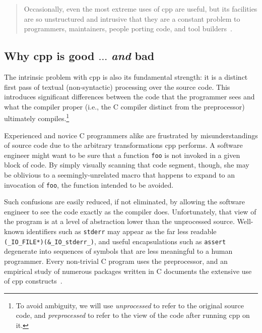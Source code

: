 \documentclass{article}
\newcommand{\Cpp}{\mbox{\textsf{cpp}}}
\newcommand{\C}{\mbox{C}}
\newcommand{\ie}{i.e.,}
\begin{document}
\begin{quotation}
\noindent Occasionally, even the most extreme uses of \Cpp{} are useful, but its
facilities are so unstructured and intrusive that they are a constant
problem to programmers, maintainers, people porting code, and tool
builders~\cite[p.~424]{Stroustrup94}.
\end{quotation}

\subsection*{Why \Cpp{} is good $\ldots$ \emph{and} bad}

The intrinsic problem with \Cpp{} is also its fundamental strength: it
is a distinct first pass of textual (non-syntactic) processing over the
source code.  This introduces significant differences between the code
that the programmer sees and what the compiler proper (\ie{} the \C{}
compiler distinct from the preprocessor) ultimately
compiles.\footnote{To avoid ambiguity, we will use \emph{unprocessed} to
  refer to the original source code, and \emph{preprocessed} to refer to
  the view of the code after running \Cpp{} on it.}

Experienced and novice \C{} programmers alike are frustrated by
misunderstandings of source code due to the arbitrary transformations
\Cpp{} performs. A software engineer might want to be sure that a
function \texttt{foo} is not invoked in a given block of code.  By
simply visually scanning that code segment, though, she may be oblivious 
to a seemingly-unrelated macro that happens to expand to an invocation
of \texttt{foo}, the function intended to be avoided.

Such confusions are easily reduced, if not eliminated,
by allowing the software engineer to see the code exactly as the
compiler does.  Unfortunately, that view of the program is at a level of
abstraction lower than the unprocessed source.  Well-known
identifiers such as \texttt{stderr} may appear as the far less readable
\texttt{(\_IO\_FILE*)(\&\_IO\_stderr\_)},
and useful encapsulations such as \texttt{assert} degenerate into
sequences of symbols that are less meaningful to a human programmer.  Every
non-trivial \C{} program uses the preprocessor, and an empirical study
of numerous packages written in \C{} documents the extensive use of \Cpp{}
constructs~\cite{EmpCpp-TR}.
\end{document}
